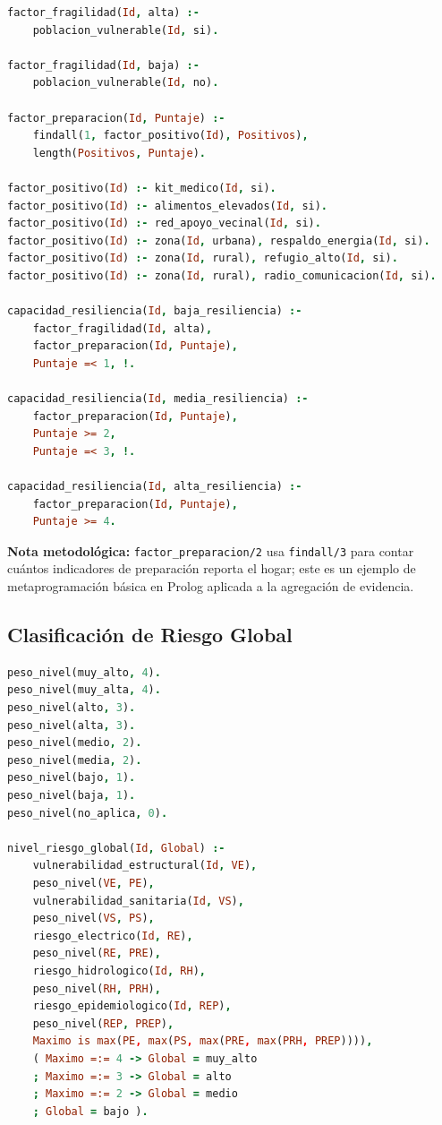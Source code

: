 \documentclass[12pt, letterpaper]{article}
\begin{document}
\begin{lstlisting}[language=Prolog, caption={Reglas de capacidad de resiliencia}]
factor_fragilidad(Id, alta) :-
    poblacion_vulnerable(Id, si).

factor_fragilidad(Id, baja) :-
    poblacion_vulnerable(Id, no).

factor_preparacion(Id, Puntaje) :-
    findall(1, factor_positivo(Id), Positivos),
    length(Positivos, Puntaje).

factor_positivo(Id) :- kit_medico(Id, si).
factor_positivo(Id) :- alimentos_elevados(Id, si).
factor_positivo(Id) :- red_apoyo_vecinal(Id, si).
factor_positivo(Id) :- zona(Id, urbana), respaldo_energia(Id, si).
factor_positivo(Id) :- zona(Id, rural), refugio_alto(Id, si).
factor_positivo(Id) :- zona(Id, rural), radio_comunicacion(Id, si).

capacidad_resiliencia(Id, baja_resiliencia) :-
    factor_fragilidad(Id, alta),
    factor_preparacion(Id, Puntaje),
    Puntaje =< 1, !.

capacidad_resiliencia(Id, media_resiliencia) :-
    factor_preparacion(Id, Puntaje),
    Puntaje >= 2,
    Puntaje =< 3, !.

capacidad_resiliencia(Id, alta_resiliencia) :-
    factor_preparacion(Id, Puntaje),
    Puntaje >= 4.
\end{lstlisting}

\textbf{Nota metodológica:} \texttt{factor\_preparacion/2} usa \texttt{findall/3} para contar cuántos indicadores de preparación reporta el hogar; este es un ejemplo de metaprogramación básica en Prolog aplicada a la agregación de evidencia.

\subsection{Clasificación de Riesgo Global}

\begin{lstlisting}[language=Prolog, caption={Clasificación de riesgo global}]
peso_nivel(muy_alto, 4).
peso_nivel(muy_alta, 4).
peso_nivel(alto, 3).
peso_nivel(alta, 3).
peso_nivel(medio, 2).
peso_nivel(media, 2).
peso_nivel(bajo, 1).
peso_nivel(baja, 1).
peso_nivel(no_aplica, 0).

nivel_riesgo_global(Id, Global) :-
    vulnerabilidad_estructural(Id, VE),
    peso_nivel(VE, PE),
    vulnerabilidad_sanitaria(Id, VS),
    peso_nivel(VS, PS),
    riesgo_electrico(Id, RE),
    peso_nivel(RE, PRE),
    riesgo_hidrologico(Id, RH),
    peso_nivel(RH, PRH),
    riesgo_epidemiologico(Id, REP),
    peso_nivel(REP, PREP),
    Maximo is max(PE, max(PS, max(PRE, max(PRH, PREP)))),
    ( Maximo =:= 4 -> Global = muy_alto
    ; Maximo =:= 3 -> Global = alto
    ; Maximo =:= 2 -> Global = medio
    ; Global = bajo ).
\end{lstlisting}
\end{document}

